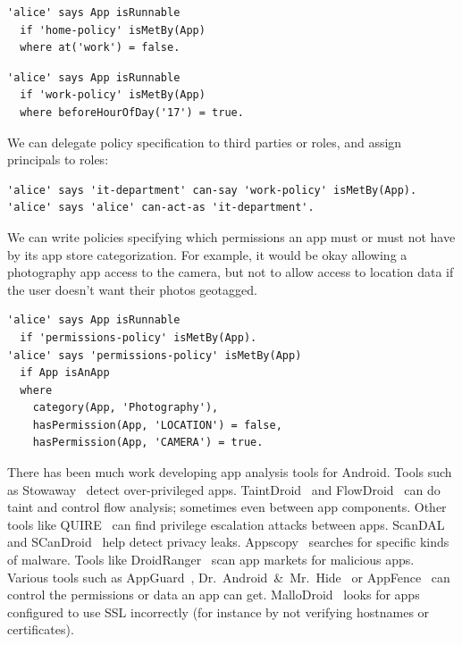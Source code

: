 \documentclass[]{llncs}
\newcommand{\citep}[1]{\cite{#1}}
\begin{document}
\noindent
\begin{minipage}{\linewidth}
  \begin{minipage}{0.5\linewidth}
    \begin{lstlisting}
'alice' says App isRunnable
  if 'home-policy' isMetBy(App)
  where at('work') = false.
    \end{lstlisting}
  \end{minipage}
  \begin{minipage}{0.5\linewidth}
    \begin{lstlisting}
'alice' says App isRunnable
  if 'work-policy' isMetBy(App)
  where beforeHourOfDay('17') = true.
    \end{lstlisting}
  \end{minipage}
\end{minipage}
\noindent We can delegate policy specification to third parties or roles, and assign principals to roles:
\begin{lstlisting}
'alice' says 'it-department' can-say 'work-policy' isMetBy(App).
'alice' says 'alice' can-act-as 'it-department'.
\end{lstlisting}
We can write policies specifying which permissions an app must or must not have by its app store categorization.
For example, it would be okay allowing a photography app access to the camera, but not to allow access to location data if the user doesn't want their photos geotagged.
\begin{lstlisting}
'alice' says App isRunnable
  if 'permissions-policy' isMetBy(App).
'alice' says 'permissions-policy' isMetBy(App)
  if App isAnApp
  where
    category(App, 'Photography'),
    hasPermission(App, 'LOCATION') = false,
    hasPermission(App, 'CAMERA') = true.
\end{lstlisting}

There has been much work developing app analysis tools for Android.
Tools such as Stowaway~\cite{Felt:2011kj} detect over-privileged apps.
TaintDroid~\cite{Enck:2010uw} and FlowDroid~\cite{Arzt:2014kf,Li:2015wo} can do taint and control flow analysis; sometimes even between app components.
Other tools like QUIRE~\cite{Bugiel:2012ui} can find privilege escalation attacks between apps.
ScanDAL~\cite{Kim:2012vt} and SCanDroid~\cite{Fuchs:2009vi} help detect privacy leaks.
Appscopy~\cite{Feng:kPGZr_ja} searches for specific kinds of malware.
Tools like DroidRanger~\cite{Zhou:2012tb} scan app markets for malicious apps.
Various tools such as AppGuard~\cite{Backes:2012vm}, Dr.~Android~\&~Mr.~Hide~\cite{Jeon:2012ki} or AppFence~\cite{Hornyack:2011wq} can control the permissions or data an app can get.
MalloDroid~\citep{Fahl:2012dj} looks for apps configured to use SSL incorrectly (for instance by not verifying hostnames or certificates).
\end{document}
